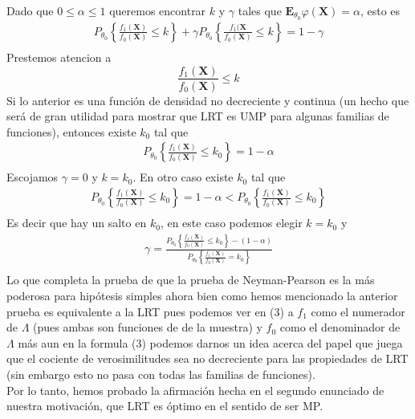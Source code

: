 \documentclass[peerreview]{IEEEtran}
\begin{document}
Dado que $0 \leq \alpha \leq 1$ queremos encontrar $k$ y $\gamma$ tales que $\mathbf{E}_{\theta_0}\varphi(\mathbf{X} ) =\alpha$, esto es 
\begin{equation*}
\begin{split}
P_{\theta_0}\left\{ \frac{f_1(\mathbf{X})}{f_0(\mathbf{X})} \leq k \right\} + \gamma P_{\theta_0}\left\{ \frac{f_1(\mathbf{X}}{f_0(\mathbf{X})} \leq k  \right\} = 1- \gamma \\
\end{split}
\end{equation*}
Prestemos atencion a  
%
\begin{equation}
\frac{f_1(\mathbf{X})}{f_0(\mathbf{X})} \leq k
\end{equation}
Si lo anterior es una función de densidad no decreciente y continua (un hecho que será de gran utilidad para mostrar que LRT es UMP para algunas familias de funciones), entonces existe $k_0$ tal que 
\begin{equation*}
\begin{split}
P_{\theta_0}\left\{ \frac{f_1(\mathbf{X})}{f_0(\mathbf{X})} \leq k_0 \right\}=1-\alpha\\
\end{split}
\end{equation*}
Escojamos $\gamma=0$ y $k=k_0$. En otro caso existe $k_0$ tal que 
\begin{equation*}
\begin{split}
P_{\theta_0}\left\{ \frac{f_1(\mathbf{X})}{f_0(\mathbf{X})} \leq k_0 \right\}=1-\alpha < P_{\theta_0}\left\{ \frac{f_1(\mathbf{X})}{f_0(\mathbf{X})} \leq k_0 \right\} \\
\end{split}
\end{equation*}
Es decir que hay un salto en $k_0$, en este caso podemos elegir $k=k_0$ y 
\begin{equation*}
\begin{split}
\gamma = \frac{P_{\theta_0}\left\{ \frac{f_1(\mathbf{X})}{f_0(\mathbf{X})} \leq k_0 \right\} -(1-\alpha)} { P_{\theta_0}\left\{ \frac{f_1(\mathbf{X})}{f_0(\mathbf{X})} = k_0 \right\}} \\
\end{split}
\end{equation*}
Lo que completa la prueba de que la prueba de Neyman-Pearson es la más poderosa para hipótesis simples ahora bien como hemos mencionado la anterior prueba es equivalente a la LRT pues podemos ver en (3) a $f_1$ como el numerador de $\Lambda$ (pues ambas son funciones de de la muestra) y $f_0$ como el denominador de $\Lambda$ más aun en la formula (3) podemos darnos un idea acerca del papel que juega que el cociente de verosimilitudes sea no decreciente para las propiedades de LRT (sin embargo esto no pasa con todas las familias de funciones). \\
Por lo tanto, hemos probado la afirmación hecha en el segundo enunciado de nuestra motivación, que LRT es óptimo en el sentido de ser MP.   
\end{document}
